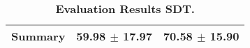 \begin{table}[htb]
{\begin{tabular}{lll}
\midrule
\textbf{Summary                                  } &                  \phantom{0}59.98 $\pm$ 17.97 &                      \phantom{0}70.58 $\pm$ 15.90 \\
\bottomrule
\end{tabular}%
}
\caption{\textbf{Evaluation Results SDT.}}
\label{tab:eval-results}
\end{table}
